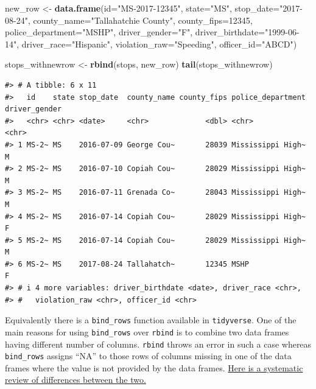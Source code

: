 \documentclass[
]{book}
\newenvironment{Shaded}{\begin{snugshade}}{\end{snugshade}}
\newcommand{\AttributeTok}[1]{\textcolor[rgb]{0.13,0.29,0.53}{#1}}
\newcommand{\DecValTok}[1]{\textcolor[rgb]{0.00,0.00,0.81}{#1}}
\newcommand{\FunctionTok}[1]{\textcolor[rgb]{0.13,0.29,0.53}{\textbf{#1}}}
\newcommand{\NormalTok}[1]{#1}
\newcommand{\OtherTok}[1]{\textcolor[rgb]{0.56,0.35,0.01}{#1}}
\newcommand{\StringTok}[1]{\textcolor[rgb]{0.31,0.60,0.02}{#1}}
\begin{document}
\begin{Shaded}
\begin{Highlighting}[]
\NormalTok{new\_row }\OtherTok{\textless{}{-}} \FunctionTok{data.frame}\NormalTok{(}\AttributeTok{id=}\StringTok{"MS{-}2017{-}12345"}\NormalTok{, }\AttributeTok{state=}\StringTok{"MS"}\NormalTok{, }\AttributeTok{stop\_date=}\StringTok{"2017{-}08{-}24"}\NormalTok{,}
                \AttributeTok{county\_name=}\StringTok{"Tallahatchie County"}\NormalTok{, }\AttributeTok{county\_fips=}\DecValTok{12345}\NormalTok{,}
                \AttributeTok{police\_department=}\StringTok{"MSHP"}\NormalTok{, }\AttributeTok{driver\_gender=}\StringTok{"F"}\NormalTok{, }\AttributeTok{driver\_birthdate=}\StringTok{"1999{-}06{-}14"}\NormalTok{,}
                \AttributeTok{driver\_race=}\StringTok{"Hispanic"}\NormalTok{, }\AttributeTok{violation\_raw=}\StringTok{"Speeding"}\NormalTok{, }\AttributeTok{officer\_id=}\StringTok{"ABCD"}\NormalTok{)}

\NormalTok{stops\_withnewrow }\OtherTok{\textless{}{-}} \FunctionTok{rbind}\NormalTok{(stops, new\_row)}
\FunctionTok{tail}\NormalTok{(stops\_withnewrow)}
\end{Highlighting}
\end{Shaded}

\begin{verbatim}
#> # A tibble: 6 x 11
#>   id    state stop_date  county_name county_fips police_department driver_gender
#>   <chr> <chr> <date>     <chr>             <dbl> <chr>             <chr>        
#> 1 MS-2~ MS    2016-07-09 George Cou~       28039 Mississippi High~ M            
#> 2 MS-2~ MS    2016-07-10 Copiah Cou~       28029 Mississippi High~ M            
#> 3 MS-2~ MS    2016-07-11 Grenada Co~       28043 Mississippi High~ M            
#> 4 MS-2~ MS    2016-07-14 Copiah Cou~       28029 Mississippi High~ F            
#> 5 MS-2~ MS    2016-07-14 Copiah Cou~       28029 Mississippi High~ M            
#> 6 MS-2~ MS    2017-08-24 Tallahatch~       12345 MSHP              F            
#> # i 4 more variables: driver_birthdate <date>, driver_race <chr>,
#> #   violation_raw <chr>, officer_id <chr>
\end{verbatim}

Equivalently there is a \texttt{bind\_rows} function available in \texttt{tidyverse}. One of the main reasons for using \texttt{bind\_rows} over \texttt{rbind} is to combine two data frames having different number of columns. \texttt{rbind} throws an error in such a case whereas \texttt{bind\_rows} assigns ``NA'' to those rows of columns missing in one of the data frames where the value is not provided by the data frames. \href{https://stackoverflow.com/a/59482527}{Here is a systematic review of differences between the two.}
\end{document}
